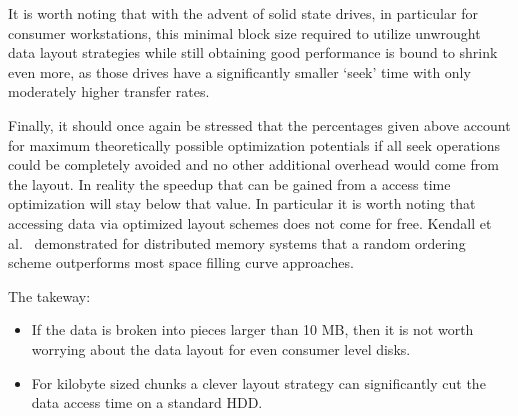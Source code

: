
It is worth noting that with the advent of solid state drives, in
particular for consumer workstations, this minimal block size required
to utilize unwrought data layout strategies while still obtaining
good performance is bound to shrink even more, as those drives have a
significantly smaller `seek' time with only moderately higher transfer
rates.

Finally, it should once again be stressed that the percentages given above account for maximum theoretically possible optimization potentials if all seek operations could be
completely avoided and no other additional overhead would come from the layout.
In reality the speedup that can be gained from a access time optimization will stay below that value. In particular it is worth noting that accessing data via optimized layout schemes does not come for free. Kendall et al.~\cite{Kendall:2009:TDO} demonstrated for distributed memory systems that a random ordering scheme outperforms most space filling curve approaches.

The takeway:

\begin{itemize}
  \item If the data is broken into pieces larger than 10 MB, then it
  is not worth worrying about the data layout for even consumer level
  disks.
  \item For kilobyte sized chunks a clever layout strategy can
           significantly cut the data access time on a standard HDD.
\end{itemize}

% 

